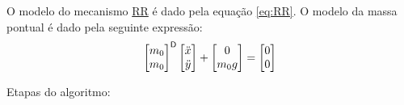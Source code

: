 \documentclass[a4paper,11pt,brazil,fleqn]{article}
\begin{document}
O modelo do mecanismo \underline{R}\underline{R} \'e dado pela equa\c{c}\~ao \eqref{eq:RR}. O modelo da massa pontual \'e dado pela seguinte express\~ao:
\begin{equation} \label{eq:MassaPontual}
\begin{bmatrix}
m_0 \\
m_0 \\
\end{bmatrix}^{\mathsf{D}}
\begin{bmatrix}
\ddot{x} \\
\ddot{y}
\end{bmatrix}
+
\begin{bmatrix}
0 \\
m_0 g
\end{bmatrix}
=
\begin{bmatrix}
0 \\
0
\end{bmatrix}
\end{equation}

Etapas do algoritmo:
\end{document}
